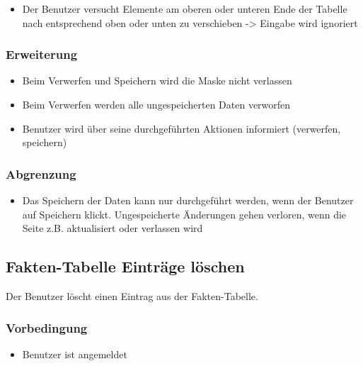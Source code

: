 \documentclass[a4paper,12pt]{article}
\begin{document}
\begin{itemize}

\item
  Der Benutzer versucht Elemente am oberen oder unteren Ende der Tabelle
  nach entsprechend oben oder unten zu verschieben -\textgreater{}
  Eingabe wird ignoriert
\end{itemize}

\subsubsection{Erweiterung}\label{erweiterung-9}

\begin{itemize}

\item
  Beim Verwerfen und Speichern wird die Maske nicht verlassen
\item
  Beim Verwerfen werden alle ungespeicherten Daten verworfen
\item
  Benutzer wird über seine durchgeführten Aktionen informiert
  (verwerfen, speichern)
\end{itemize}

\subsubsection{Abgrenzung}\label{abgrenzung-9}

\begin{itemize}

\item
  Das Speichern der Daten kann nur durchgeführt werden, wenn der
  Benutzer auf Speichern klickt. Ungespeicherte Änderungen gehen
  verloren, wenn die Seite z.B. aktualisiert oder verlassen wird
\end{itemize}

\clearpage

\subsection{Fakten-Tabelle Einträge löschen}\label{benutzer-loscht-einen-eintrag-aus-der-fakten-tabelle}
Der Benutzer löscht einen Eintrag aus der Fakten-Tabelle.

\subsubsection{Vorbedingung}\label{vorbedingung-10}

\begin{itemize}

\item
  Benutzer ist angemeldet
\end{itemize}
\end{document}
